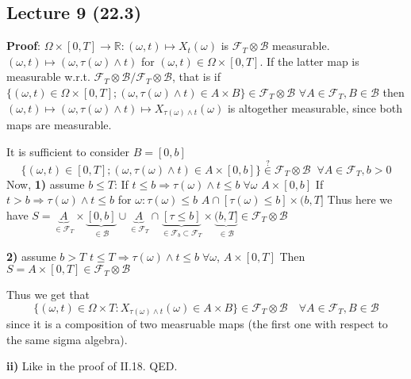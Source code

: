 \documentclass[english]{article}
\newcommand{\R}{\mathbb{R}}
\newcommand{\ub}{\underbrace}
\newcommand{\note}[1]{\noindent\textbf{#1}}
\newcommand{\F}{\mathcal F}
\newcommand{\B}{\mathcal B}
\begin{document}
\subsection*{Lecture 9 (22.3)}
\note{Proof}: $\Omega \times [0,T] \to \R: (\omega, t) \mapsto X_t(\omega)$ is $\F_T \otimes \B$ measurable. \newline
$(\omega, t) \mapsto (\omega, \tau(\omega) \wedge t)$ for $(\omega, t) \in \Omega \times [0,T]$. If the latter map is measurable w.r.t. $\mathcal F_T \otimes \B / \F_T \otimes \B$, that is if $\{(\omega, t) \in \Omega \times [0,T]; (\omega, \tau(\omega) \wedge t) \in A\times B\} \in \F_T \otimes \B$ $\forall A \in\F_T, B\in \B$ then $(\omega, t) \mapsto (\omega, \tau(\omega) \wedge t) \mapsto X_{\tau(\omega)\wedge t} (\omega)$ is altogether measurable, since both maps are measurable. \newline

It is sufficient to consider $B=[0,b]$
$$\{(\omega, t ) \in [0, T]; (\omega, \tau (\omega) \wedge t) \in A \times [0,b] \} \stackrel{?}\in \F_T \otimes \B\;\; \forall A\in \F_T, b>0$$
Now, \textbf{1)} assume $b\leq T$:
If $t \leq b \Rightarrow \tau(\omega) \wedge t \leq b \; \forall \omega$ \newline
$A\times [0,b]$\newline
If $t>b \Rightarrow \tau(\omega) \wedge t \leq b$ for $\omega: \tau(\omega)\leq b$ \newline
$A\cap [\tau(\omega) \leq b] \times (b, T]$ \newline
Thus here we have $S=\ub{A}_{\in \F_T}\times \ub{[0,b]}_{\in \B} \cup \ub{A}_{\in \F_T}\cap \ub{[\tau \leq b]}_{\in \F_b\subset \F_T} \times \ub{(b,T]}_{\in \B} \in \F_T \otimes \B$

\textbf{2)} assume $b>T$ \newline
$t \leq T \Rightarrow \tau(\omega) \wedge t \leq b \; \forall \omega$, $A\times [0,T]$ \newline
Then $S= A\times [0,T] \in \F_T \otimes \B$ \newline

Thus we get that
$$\{ (\omega ,t) \in \Omega \times T: X_{\tau(\omega)\wedge t} (\omega) \in A\times B \} \in \F_T\otimes \B\quad \forall A\in\F_T, B\in \B$$
since it is a composition of two measruable maps (the first one with respect to the same sigma algebra). \newline

\note{ii)} Like in the proof of II.18. QED. \newline
\end{document}
